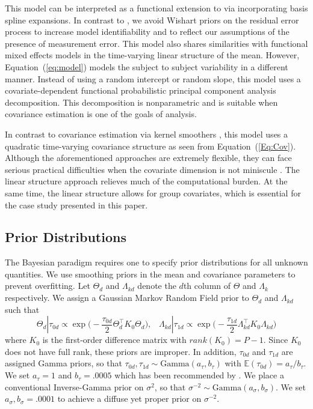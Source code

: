 \documentclass[useAMS,referee,usenatbib]{biom}
\begin{document}
This model can be interpreted as a functional extension to \citet{Hoff2012} via incorporating  basis spline expansions. In contrast to \citet{Hoff2012}, we avoid Wishart priors on the residual error process to increase model identifiability and to reflect our assumptions of the presence of measurement error. This model also shares similarities with functional mixed effects models \citep{Morris2006, Guo2002} in the time-varying linear structure of the mean. However, Equation~(\ref{eq:model}) models the subject to subject variability in a different manner. Instead of using a random intercept or random slope, this model uses a covariate-dependent functional probabilistic principal component analysis decomposition. This decomposition is nonparametric and is suitable when covariance estimation is one of the goals of analysis. 

In contrast to covariance estimation via kernel smoothers \citep{Cardot2007, Jiang2010}, this model uses a quadratic time-varying covariance structure as seen from Equation~(\ref{Eq:Cov}). Although the aforementioned approaches are extremely flexible, they can face serious practical difficulties when the covariate dimension is not miniscule \citep{Montagna2012}. The linear structure approach relieves much of the computational burden. At the same time, the linear structure allows for group covariates, which is essential for the case study presented in this paper.
\subsection{Prior Distributions}
\label{s:priors}
The Bayesian paradigm requires one to specify prior distributions for all unknown quantities. We use smoothing priors in the mean and covariance parameters to prevent overfitting. Let $\Theta_{d}$ and $\Lambda_{kd}$ denote the $d$th column of $\Theta$ and $\Lambda_{k}$ respectively. We assign a Gaussian Markov Random Field prior to $\Theta_{d}$ and $\Lambda_{kd}$ such that
\begin{equation*}
\Theta_{d}|\tau_{0d} \propto \exp\bigg(-\frac{\tau_{0d}}{2}\Theta_{d}^{\top}K_{0}\Theta_{d}\bigg),\;\;\;\Lambda_{kd}|\tau_{1d}\propto\exp\bigg(-\frac{\tau_{1d}}{2}\Lambda_{kd}^{\top}K_{0}\Lambda_{kd}\bigg)
\end{equation*}
where $K_{0}$ is the first-order difference matrix with $rank(K_{0}) = P-1$. Since $K_{0}$ does not have full rank, these priors are improper. In addition, $\tau_{0d}$ and $\tau_{1d}$ are assigned Gamma priors, so that $\tau_{0d},\tau_{1d}\sim \text{Gamma}(a_{\tau}, b_{\tau})$ with $\mathbb{E}(\tau_{0d}) = a_{\tau}/b_{\tau}$. We set $a_{\tau} = 1$ and $b_{\tau} =.0005$ which has been recommended by \citet{Lang2004}. We place a conventional Inverse-Gamma prior on $\sigma^{2}$, so that $\sigma^{-2} \sim \text{Gamma}(a_{\sigma}, b_{\sigma})$. We set $a_{\sigma},b_{\sigma} = .0001$ to achieve a diffuse yet proper prior on $\sigma^{-2}$.
\end{document}
